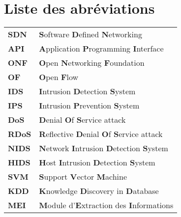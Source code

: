 
\chapter{Liste des abréviations} 
\label{Abbreviation}

\begin{tabular}{ m{2cm} m{8cm} }
\textbf{SDN} & \textbf{S}oftware \textbf{D}efined \textbf{N}etworking\\

\textbf{API} & \textbf{A}pplication \textbf{P}rogramming \textbf{I}nterface\\

\textbf{ONF} & \textbf{O}pen \textbf{N}etworking \textbf{F}oundation\\

\textbf{OF} & \textbf{O}pen \textbf{F}low\\

\textbf{IDS} & \textbf{I}ntrusion \textbf{D}etection \textbf{S}ystem\\

\textbf{IPS} & \textbf{I}ntrusion \textbf{P}revention \textbf{S}ystem\\

\textbf{DoS} & \textbf{D}enial \textbf{O}f \textbf{S}ervice attack \\

\textbf{RDoS} & \textbf{R}eflective \textbf{D}enial \textbf{O}f \textbf{S}ervice attack \\

\textbf{NIDS} & \textbf{N}etwork \textbf{I}ntrusion \textbf{D}etection \textbf{S}ystem\\

\textbf{HIDS} & \textbf{H}ost \textbf{I}ntrusion \textbf{D}etection \textbf{S}ystem\\

\textbf{SVM} & \textbf{S}upport \textbf{V}ector \textbf{M}achine \\

\textbf{KDD} & \textbf{K}nowledge \textbf{D}iscovery in \textbf{D}atabase \\

\textbf{MEI} & \textbf{M}odule d'\textbf{E}xtraction des \textbf{I}nformations \\

\end{tabular}
